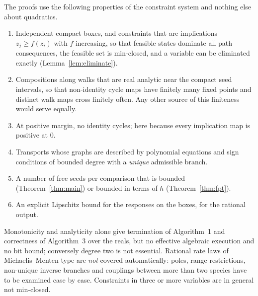 \documentclass[11pt,a4paper]{article}
\theoremstyle{plain}
\theoremstyle{definition}
\theoremstyle{remark}
\begin{document}
The proofs use the following properties of the constraint system and nothing else about quadratics.
\begin{enumerate}[label=(H\arabic*)]
\item Independent compact boxes, and constraints that are implications $z_j\ge f(z_i)$ with $f$ increasing, so that feasible states dominate all path consequences, the feasible set is min-closed, and a variable can be eliminated exactly (Lemma~\ref{lem:eliminate}).
\item Compositions along walks that are real analytic near the compact seed intervals, so that non-identity cycle maps have finitely many fixed points and distinct walk maps cross finitely often. Any other source of this finiteness would serve equally.
\item At positive margin, no identity cycles; here because every implication map is positive at $0$.
\item Transports whose graphs are described by polynomial equations and sign conditions of bounded degree with a \emph{unique} admissible branch.
\item A number of free seeds per comparison that is bounded (Theorem~\ref{thm:main}) or bounded in terms of $h$ (Theorem~\ref{thm:fpt}).
\item An explicit Lipschitz bound for the responses on the boxes, for the rational output.
\end{enumerate}
Monotonicity and analyticity alone give termination of Algorithm~1 and correctness of Algorithm~3 over the reals, but no effective algebraic execution and no bit bound; conversely degree two is not essential. Rational rate laws of Michaelis--Menten type are \emph{not} covered automatically: poles, range restrictions, non-unique inverse branches and couplings between more than two species have to be examined case by case. Constraints in three or more variables are in general not min-closed.
\end{document}
